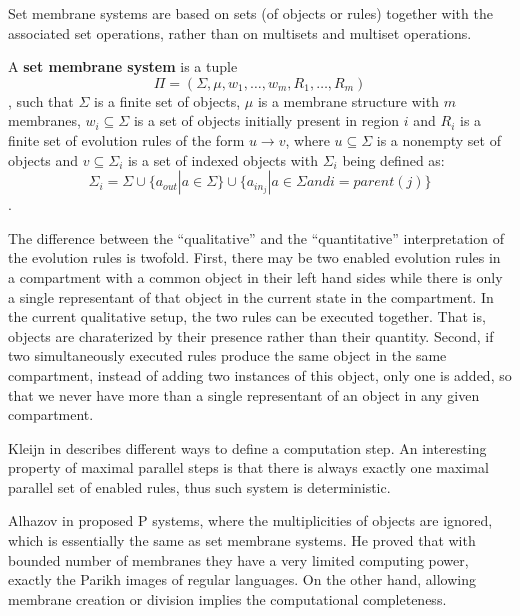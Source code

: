 Set membrane systems \cite{Kleijn11SetMembrane} are based on sets (of objects or rules) together with the associated set operations, rather than on multisets and multiset operations.

\begin{definition}
  A {\bf set membrane system} is a tuple $$\Pi = (\Sigma, \mu, w_1, \ldots, w_m, R_1, \ldots, R_m)$$, such that $\Sigma$ is a finite set of objects, $\mu$ is a membrane structure with $m$ membranes, $w_i\subseteq\Sigma$ is a set of objects initially present in region $i$ and $R_i$ is a finite set of evolution rules of the form $u\rightarrow v$, where $u\subseteq\Sigma$ is a nonempty set of objects and $v\subseteq\Sigma_i$ is a set of indexed objects with $\Sigma_i$ being defined as: $$\Sigma_i = \Sigma\cup\{a_{out}|a\in \Sigma\}\cup\{a_{in_j}|a\in\Sigma\mathrel{and}i=parent(j)\}$$.
\end{definition}

The difference between the ``qualitative'' and the ``quantitative'' interpretation of the evolution rules is twofold. First, there may be two enabled evolution rules in a compartment with a common object in their left hand sides while there is only a single representant of that object in the current state in the compartment. In the current qualitative setup, the two rules can be executed together. That is, objects are charaterized by their presence rather than their quantity. Second, if two simultaneously executed rules produce the same object in the same compartment, instead of adding two instances of this object, only one is added, so that we never have more than a single representant of an object in any given compartment.

Kleijn in \cite{Kleijn11SetMembrane} describes different ways to define a computation step. An interesting property of maximal parallel steps is that there is always exactly one maximal parallel set of enabled rules, thus such system is deterministic.

Alhazov in \cite{Alhazov05WithoutMultiplicities} proposed P systems, where the multiplicities of objects are ignored, which is essentially the same as set membrane systems. He proved that with bounded number of membranes they have a very limited computing power, exactly the Parikh images of regular languages. On the other hand, allowing membrane creation or division implies the computational completeness.

